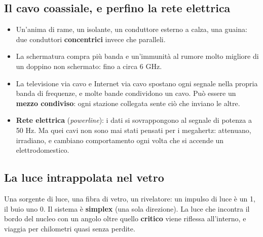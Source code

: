 \subsection{Il cavo coassiale, e perfino la rete elettrica}

\begin{itemize}
    \item Un'anima di rame, un isolante, un conduttore esterno a calza, una guaina: due conduttori \textbf{concentrici} invece che
          paralleli.
    \item La schermatura compra più banda e un'immunità al rumore molto migliore di un doppino non schermato: fino a circa 6 GHz.
    \item La televisione via cavo e Internet via cavo spostano ogni segnale nella propria banda di frequenze, e molte bande
          condividono un cavo. Può essere un \textbf{mezzo condiviso}: ogni stazione collegata sente ciò che inviano le altre.
    \item \textbf{Rete elettrica} (\emph{powerline}): i dati si sovrappongono al segnale di potenza a 50 Hz. Ma quei cavi non sono mai
          stati pensati per i megahertz: attenuano, irradiano, e cambiano comportamento ogni volta che si accende un elettrodomestico.
\end{itemize}

\subsection{La luce intrappolata nel vetro}

Una sorgente di luce, una fibra di vetro, un rivelatore: un impulso di luce è un 1, il buio uno 0. Il sistema è \textbf{simplex}
(una sola direzione). La luce che incontra il bordo del nucleo con un angolo oltre quello \textbf{critico} viene riflessa all'interno,
e viaggia per chilometri quasi senza perdite.

